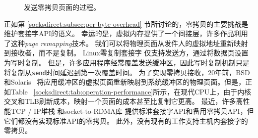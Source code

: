 \begin{figure}[t]
	\centering
	\hspace{0.02\textwidth}
	
	\caption{发送零拷贝页面的过程。}
\end{figure}


正如第 \ref {socksdirect:subsec:per-byte-overhead} 节所讨论的，零拷贝的主要挑战是维护套接字API的语义。
幸运的是，虚拟内存提供了一个间接层，许多作品利用了这种\emph {page remapping}技术。
我们可以将物理页面从发件人的虚拟地址重新映射到接收者，而不是复制。
Linux零复制套接字 \cite {linux-zero-copy}仅支持发送方，通过将数据页设置为写时复制。
但是，许多应用程序经常覆盖发送缓冲区，因此写时复制机制只是将复制从\texttt {send}时间延迟到第一次覆盖时间。
为了实现零拷贝接收，20年前，BSD~ \cite {thadani1995efficient}和Solaris~ \cite {chu1996zero}将应用缓冲区的虚拟页面重新映射到系统缓冲区的物理页面。但是，正如Table~ \ref {socksdirect:tab:operation-performance}所示，在现代CPU上，由于内核交叉和TLB刷新成本，映射一个页面的成本甚至比复制它更高。
最近，许多高性能TCP / IP堆栈 \cite {han2012megapipe,yasukata2016stackmap}和socket-to-RDMA库 \cite {rsockets,socketsdirect}提供标准套接字API和备用零拷贝API，但它们都没有实现标准API的零拷贝。
此外，没有现有的工作支持主机内套接字的零拷贝。



